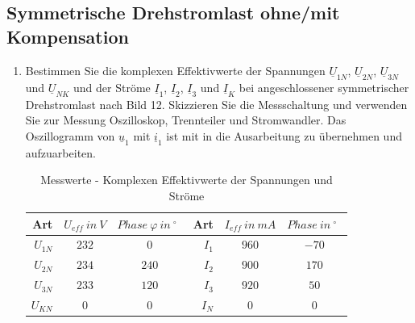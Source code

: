  	\subsection{Symmetrische Drehstromlast ohne/mit Kompensation}
	 	\begin{enumerate}[label=\alph*)]
	 		\item Bestimmen Sie die komplexen Effektivwerte der Spannungen $\underline{U}_{1N}$, $\underline{U}_{2N}$, $\underline{U}_{3N}$ und $\underline{U}_{NK}$ und der Ströme $\underline{I}_{1}$, $\underline{I}_{2}$, $\underline{I}_{3}$ und $\underline{I}_{K}$ bei angeschlossener symmetrischer Drehstromlast nach Bild 12. Skizzieren Sie die Messschaltung und verwenden Sie zur Messung Oszilloskop, Trennteiler und Stromwandler. Das Oszillogramm von $\underline{u}_{1}$ mit $\underline{i}_{1}$ ist mit in die Ausarbeitung zu übernehmen und aufzuarbeiten.
	 		 		
	 		\begin{center}
	 			\begin{table}[h]
	 				\begin{tabular}{r c c r c c}
	 					\hline
	 					Art & \( U_{eff}\ in\ V \) & \( Phase\ \varphi\ in\ ^\circ\ \ \)  & Art & \( I_{eff}\ in\ mA \) & \( Phase\ in\ ^\circ\ \ \) \\
	 					\hline
	 					$U_{1N}$ & \( 232 \) & \( 0 \) &
	 					$I_{1}$	 & \( 960 \) & \( -70 \) \\
	 					$U_{2N}$ & \( 234 \) & \( 240 \) &
	 					$I_{2}$	 & \( 900 \) & \( 170 \) \\
	 					$U_{3N}$ & \( 233 \) & \( 120 \) &
	 					$I_{3}$	 & \( 920 \) & \( 50 \) \\
	 					$U_{KN}$ & \( 0   \) & \( 0 \) &
	 					$I_{N}$	 & \( 0   \) & \( 0 \) \\
	 					\hline
	 				\end{tabular}
	 				\caption{Messwerte - Komplexen Effektivwerte der Spannungen und Ströme}
	 			\end{table}
	 		\end{center}
	 		

\end{enumerate}
